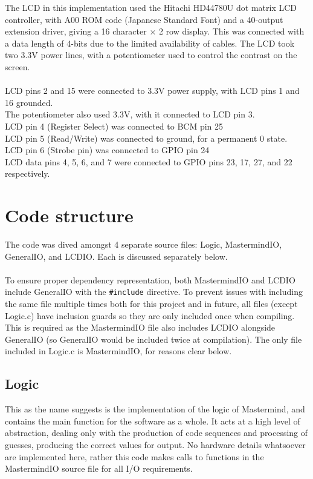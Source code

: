 \documentclass[a4paper, titlepage]{article}
\begin{document}
The LCD in this implementation used the Hitachi HD44780U dot matrix LCD controller, with A00 ROM code (Japanese Standard Font) and a 40-output extension driver, giving a 16 character $\times$ 2 row display. This was connected with a data length of 4-bits due to the limited availability of cables. The LCD took two 3.3V power lines, with a potentiometer used to control the contrast on the screen. 
\\
\\
LCD pins 2 and 15 were connected to 3.3V power supply, with LCD pins 1 and 16 grounded.\\
The potentiometer also used 3.3V, with it connected to LCD pin 3.\\
LCD pin 4 (Register Select) was connected to BCM pin 25\\
LCD pin 5 (Read/Write) was connected to ground, for a permanent 0 state.\\
LCD pin 6 (Strobe pin) was connected to GPIO pin 24 \\
LCD data pins 4, 5, 6, and 7 were connected to GPIO pins 23, 17, 27, and 22 respectively.\\

\section{Code structure}

The code was dived amongst 4 separate source files: Logic, MastermindIO, GeneralIO, and LCDIO. Each is discussed separately below. 
\\
\\
To ensure proper dependency representation, both MastermindIO and LCDIO include GeneralIO with the \texttt{\#include} directive. To prevent issues with including the same file multiple times both for this project and in future, all files (except Logic.c) have inclusion guards so they are only included once when compiling. This is required as the MastermindIO file also includes LCDIO alongside GeneralIO (so GeneralIO would be included twice at compilation). The only file included in Logic.c is MastermindIO, for reasons clear below.

\subsection{Logic}

This as the name suggests is the implementation of the logic of Mastermind, and contains the main function for the software as a whole. It acts at a high level of abstraction, dealing only with the production of code sequences and processing of guesses, producing the correct values for output. No hardware details whatsoever are implemented here, rather this code makes calls to functions in the MastermindIO source file for all I/O requirements.
\end{document}
